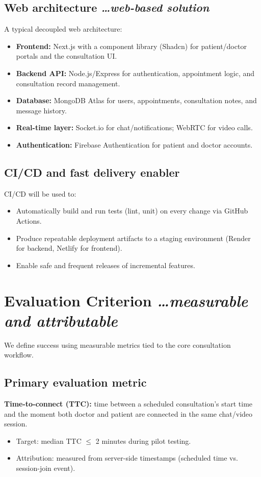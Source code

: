 \documentclass[11pt,a4paper]{article}
\newcommand{\BvrHint}[1]{%
{\normalfont\normalsize\itshape\hfill #1}}
\begin{document}
\subsection{Web architecture %
\BvrHint{\ldots web-based solution}}
A typical decoupled web architecture:
\begin{itemize}[leftmargin=0.7cm]
\item \textbf{Frontend:} Next.js with a component library (Shadcn) for patient/doctor portals and the consultation UI.
\item \textbf{Backend API:} Node.js/Express for authentication, appointment logic, and consultation record management.
\item \textbf{Database:} MongoDB Atlas for users, appointments, consultation notes, and message history.
\item \textbf{Real-time layer:} Socket.io for chat/notifications; WebRTC for video calls.
\item \textbf{Authentication:} Firebase Authentication for patient and doctor accounts.
\end{itemize}

\subsection{CI/CD and fast delivery enabler}
CI/CD will be used to:
\begin{itemize}[leftmargin=0.7cm]
\item Automatically build and run tests (lint, unit) on every change via GitHub Actions.
\item Produce repeatable deployment artifacts to a staging environment (Render for backend, Netlify for frontend).
\item Enable safe and frequent releases of incremental features.
\end{itemize}

\section{Evaluation Criterion %
\BvrHint{\ldots measurable and attributable}}
We define success using measurable metrics tied to the
core consultation workflow.

\subsection{Primary evaluation metric}
\textbf{Time-to-connect (TTC):} time between a
scheduled consultation's start time and the moment both
doctor and patient are connected in the same
chat/video session.
\begin{itemize}[leftmargin=0.7cm]
\item Target: median TTC $\le$ 2 minutes during pilot testing.
\item Attribution: measured from server-side timestamps (scheduled time vs. session-join event).
\end{itemize}
\end{document}
